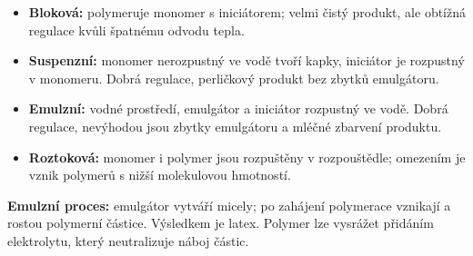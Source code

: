 \begin{itemize}
\item \textbf{Bloková:} polymeruje monomer s iniciátorem; velmi čistý produkt, ale obtížná regulace kvůli špatnému odvodu tepla.
\item \textbf{Suspenzní:} monomer nerozpustný ve vodě tvoří kapky, iniciátor je rozpustný v monomeru. Dobrá regulace, perličkový produkt bez zbytků emulgátoru.
\item \textbf{Emulzní:} vodné prostředí, emulgátor a iniciátor rozpustný ve vodě. Dobrá regulace, nevýhodou jsou zbytky emulgátoru a mléčné zbarvení produktu.
\item \textbf{Roztoková:} monomer i polymer jsou rozpuštěny v rozpouštědle; omezením je vznik polymerů s nižší molekulovou hmotností.
\end{itemize}
\textbf{Emulzní proces:} emulgátor vytváří micely; po zahájení polymerace vznikají a rostou polymerní částice. Výsledkem je latex. Polymer lze vysrážet přidáním elektrolytu, který neutralizuje náboj částic.
